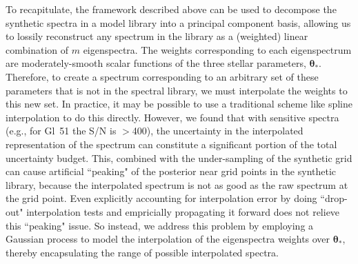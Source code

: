 \documentclass[iop,floatfix,numberedappendix,twocolappendix]{emulateapj}
\newcommand{\vt}{ {\bm \theta}}
\begin{document}
To recapitulate, the framework described above can be used to decompose the synthetic spectra in a 
model library into a principal component basis, allowing us to lossily reconstruct any spectrum in 
the library as a (weighted) linear combination of $m$ eigenspectra.  The weights corresponding to 
each eigenspectrum are moderately-smooth scalar functions of the three stellar parameters, 
$\vt_{\ast}$.  Therefore, to create a spectrum corresponding to an arbitrary set of these 
parameters that is not in the spectral library, we must interpolate the weights to this new set.  
In practice, it may be possible to use a traditional scheme like spline interpolation to do this 
directly.  However, we found that with sensitive spectra (e.g., for Gl~51 the S/N is $>$400), the 
uncertainty in the interpolated representation of the spectrum can constitute a significant portion 
of the total uncertainty budget.  This, combined with the under-sampling of the synthetic grid can 
cause artificial ``peaking" of the posterior near grid points in the synthetic library, because the 
interpolated spectrum is not as good as the raw spectrum at the grid point.  Even explicitly 
accounting for interpolation error by doing ``drop-out" interpolation tests and empricially 
propagating it forward does not relieve this ``peaking" issue.  So instead, we address this problem 
by employing a Gaussian process to model the interpolation of the eigenspectra weights over 
$\vt_{\ast}$, thereby encapsulating the range of possible interpolated spectra. 
\end{document}
